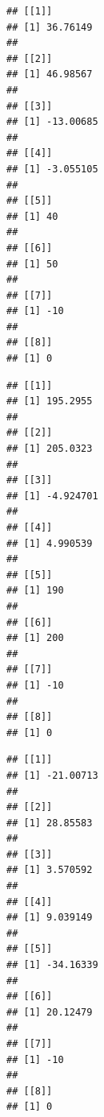 \documentclass[
]{article}
\newenvironment{Shaded}{\begin{snugshade}}{\end{snugshade}}
\newcommand{\ControlFlowTok}[1]{\textcolor[rgb]{0.13,0.29,0.53}{\textbf{#1}}}
\newcommand{\FunctionTok}[1]{\textcolor[rgb]{0.00,0.00,0.00}{#1}}
\newcommand{\NormalTok}[1]{#1}
\newcommand{\SpecialCharTok}[1]{\textcolor[rgb]{0.00,0.00,0.00}{#1}}
\newcommand{\StringTok}[1]{\textcolor[rgb]{0.31,0.60,0.02}{#1}}
\begin{document}
\begin{verbatim}
## [[1]]
## [1] 36.76149
## 
## [[2]]
## [1] 46.98567
## 
## [[3]]
## [1] -13.00685
## 
## [[4]]
## [1] -3.055105
## 
## [[5]]
## [1] 40
## 
## [[6]]
## [1] 50
## 
## [[7]]
## [1] -10
## 
## [[8]]
## [1] 0
\end{verbatim}

\begin{Shaded}
\end{Shaded}

\begin{verbatim}
## [[1]]
## [1] 195.2955
## 
## [[2]]
## [1] 205.0323
## 
## [[3]]
## [1] -4.924701
## 
## [[4]]
## [1] 4.990539
## 
## [[5]]
## [1] 190
## 
## [[6]]
## [1] 200
## 
## [[7]]
## [1] -10
## 
## [[8]]
## [1] 0
\end{verbatim}

\begin{Shaded}
\end{Shaded}

\begin{verbatim}
## [[1]]
## [1] -21.00713
## 
## [[2]]
## [1] 28.85583
## 
## [[3]]
## [1] 3.570592
## 
## [[4]]
## [1] 9.039149
## 
## [[5]]
## [1] -34.16339
## 
## [[6]]
## [1] 20.12479
## 
## [[7]]
## [1] -10
## 
## [[8]]
## [1] 0
\end{verbatim}

\begin{Shaded}
\end{Shaded}
\end{document}
